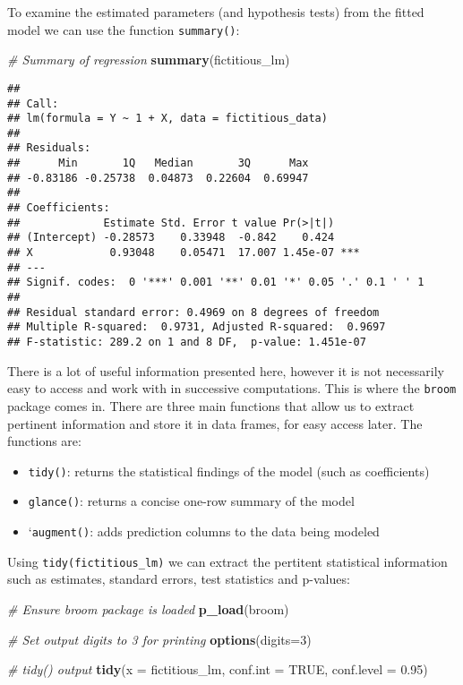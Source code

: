 \documentclass[
]{book}
\newenvironment{Shaded}{\begin{snugshade}}{\end{snugshade}}
\newcommand{\CommentTok}[1]{\textcolor[rgb]{0.56,0.35,0.01}{\textit{#1}}}
\newcommand{\DataTypeTok}[1]{\textcolor[rgb]{0.13,0.29,0.53}{#1}}
\newcommand{\DecValTok}[1]{\textcolor[rgb]{0.00,0.00,0.81}{#1}}
\newcommand{\FloatTok}[1]{\textcolor[rgb]{0.00,0.00,0.81}{#1}}
\newcommand{\KeywordTok}[1]{\textcolor[rgb]{0.13,0.29,0.53}{\textbf{#1}}}
\newcommand{\NormalTok}[1]{#1}
\newcommand{\OtherTok}[1]{\textcolor[rgb]{0.56,0.35,0.01}{#1}}
\providecommand{\tightlist}{%
  \setlength{\itemsep}{0pt}\setlength{\parskip}{0pt}}
\begin{document}
To examine the estimated parameters (and hypothesis tests) from the fitted model we can use the function \texttt{summary()}:

\begin{Shaded}
\begin{Highlighting}[]
\CommentTok{# Summary of regression }
\KeywordTok{summary}\NormalTok{(fictitious_lm)}
\end{Highlighting}
\end{Shaded}

\begin{verbatim}
## 
## Call:
## lm(formula = Y ~ 1 + X, data = fictitious_data)
## 
## Residuals:
##      Min       1Q   Median       3Q      Max 
## -0.83186 -0.25738  0.04873  0.22604  0.69947 
## 
## Coefficients:
##             Estimate Std. Error t value Pr(>|t|)    
## (Intercept) -0.28573    0.33948  -0.842    0.424    
## X            0.93048    0.05471  17.007 1.45e-07 ***
## ---
## Signif. codes:  0 '***' 0.001 '**' 0.01 '*' 0.05 '.' 0.1 ' ' 1
## 
## Residual standard error: 0.4969 on 8 degrees of freedom
## Multiple R-squared:  0.9731, Adjusted R-squared:  0.9697 
## F-statistic: 289.2 on 1 and 8 DF,  p-value: 1.451e-07
\end{verbatim}

There is a lot of useful information presented here, however it is not necessarily easy to access and work with in successive computations. This is where the \texttt{broom} package comes in. There are three main functions that allow us to extract pertinent information and store it in data frames, for easy access later. The functions are:

\begin{itemize}
\tightlist
\item
  \texttt{tidy()}: returns the statistical findings of the model (such as coefficients)
\item
  \texttt{glance()}: returns a concise one-row summary of the model
\item
  `\texttt{augment()}: adds prediction columns to the data being modeled
\end{itemize}

Using \texttt{tidy(fictitious\_lm)} we can extract the pertitent statistical information such as estimates, standard errors, test statistics and p-values:

\begin{Shaded}
\begin{Highlighting}[]
\CommentTok{# Ensure broom package is loaded}
\KeywordTok{p_load}\NormalTok{(broom)}

\CommentTok{# Set output digits to 3 for printing}
\KeywordTok{options}\NormalTok{(}\DataTypeTok{digits=}\DecValTok{3}\NormalTok{)}

\CommentTok{# tidy() output}
\KeywordTok{tidy}\NormalTok{(}\DataTypeTok{x =}\NormalTok{ fictitious_lm,}
     \DataTypeTok{conf.int =} \OtherTok{TRUE}\NormalTok{,}
     \DataTypeTok{conf.level =} \FloatTok{0.95}\NormalTok{)}
\end{Highlighting}
\end{Shaded}
\end{document}
